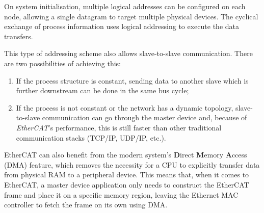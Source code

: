 On system initialisation, multiple logical addresses can be configured on each node, allowing a single datagram to target multiple physical devices.
The cyclical exchange of process information uses logical addressing to execute the data transfers.

This type of addressing scheme also allows slave-to-slave communication.
There are two possibilities of achieving this:
\begin{enumerate}
	\item If the process structure is constant, sending data to another slave which is further downstream can be done in the same bus cycle;
	\item If the process is not constant or the network has a dynamic topology, slave-to-slave communication can go through the master device and, because of \emph{EtherCAT}'s performance, this is still faster than other traditional communication stacks (TCP/IP, UDP/IP, etc.).
\end{enumerate}

EtherCAT can also benefit from the modern system's \textbf Direct \textbf Memory \textbf Access (DMA) feature, which removes the necessity for a CPU to explicitly transfer data from physical RAM to a peripheral device.
This means that, when it comes to EtherCAT, a master device application only needs to construct the EtherCAT frame and place it on a specific memory region, leaving the Ethernet MAC controller to fetch the frame on its own using DMA.
